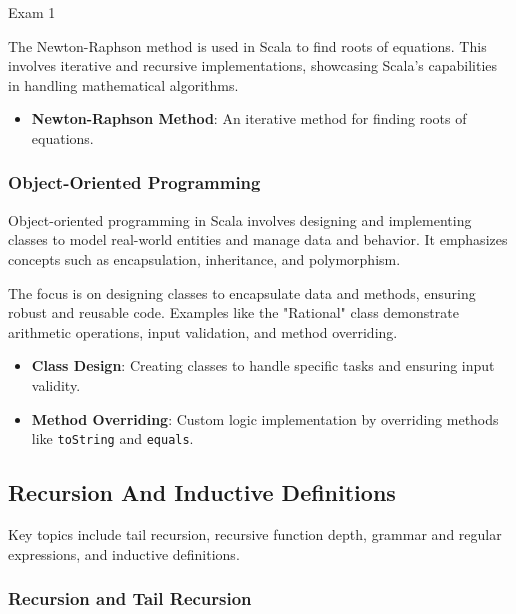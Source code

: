 \begin{examnotes}{Exam 1}
    \begin{highlight}
        The Newton-Raphson method is used in Scala to find roots of equations. This involves iterative and recursive implementations, showcasing Scala's capabilities in handling mathematical algorithms.
    
        \begin{itemize}
            \item \textbf{Newton-Raphson Method}: An iterative method for finding roots of equations.
        \end{itemize}
    \end{highlight}
    
    \subsubsection*{Object-Oriented Programming}
    
    Object-oriented programming in Scala involves designing and implementing classes to model real-world entities and manage data and behavior. It emphasizes concepts such as encapsulation, inheritance, 
    and polymorphism.
    
    \begin{highlight}
        The focus is on designing classes to encapsulate data and methods, ensuring robust and reusable code. Examples like the "Rational" class demonstrate arithmetic operations, input validation, 
        and method overriding.
    
        \begin{itemize}
            \item \textbf{Class Design}: Creating classes to handle specific tasks and ensuring input validity.
            \item \textbf{Method Overriding}: Custom logic implementation by overriding methods like \texttt{toString} and \texttt{equals}.
        \end{itemize}
    \end{highlight}

    \subsection*{Recursion And Inductive Definitions}

    Key topics include tail recursion, recursive function depth, grammar and regular expressions, and inductive definitions.
    
    \subsubsection*{Recursion and Tail Recursion}
    

\end{examnotes}
